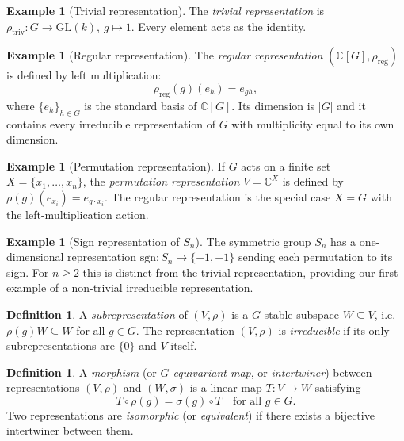 \documentclass[12pt,a4paper]{amsart}
\theoremstyle{definition}
\newtheorem{definition}[theorem]{Definition}
\newtheorem{example}[theorem]{Example}
\begin{document}
\begin{example}[Trivial representation]
The \emph{trivial representation} is $\rho_{\mathrm{triv}} \colon G \to
\mathrm{GL}(k)$, $g \mapsto 1$.  Every element acts as the identity.
\end{example}

\begin{example}[Regular representation]
The \emph{regular representation} $(\mathbb{C}[G], \rho_{\mathrm{reg}})$ is
defined by left multiplication:
\[
    \rho_{\mathrm{reg}}(g)(e_h) = e_{gh},
\]
where $\{e_h\}_{h \in G}$ is the standard basis of $\mathbb{C}[G]$.  Its
dimension is $|G|$ and it contains every irreducible representation of $G$ with
multiplicity equal to its own dimension.
\end{example}

\begin{example}[Permutation representation]
If $G$ acts on a finite set $X = \{x_1,\ldots,x_n\}$, the \emph{permutation
representation} $V = \mathbb{C}^X$ is defined by
$\rho(g)(e_{x_i}) = e_{g \cdot x_i}$.  The regular representation is the special
case $X = G$ with the left-multiplication action.
\end{example}

\begin{example}[Sign representation of $S_n$]
The symmetric group $S_n$ has a one-dimensional representation
$\mathrm{sgn} \colon S_n \to \{+1,-1\}$ sending each permutation to its sign.
For $n \geq 2$ this is distinct from the trivial representation, providing our
first example of a non-trivial irreducible representation.
\end{example}

\begin{definition}
A \emph{subrepresentation} of $(V,\rho)$ is a $G$-stable subspace $W \subseteq V$,
i.e.\ $\rho(g)W \subseteq W$ for all $g \in G$.  The representation $(V,\rho)$ is
\emph{irreducible} if its only subrepresentations are $\{0\}$ and $V$ itself.
\end{definition}

\begin{definition}
A \emph{morphism} (or \emph{$G$-equivariant map}, or \emph{intertwiner}) between
representations $(V,\rho)$ and $(W,\sigma)$ is a linear map $T \colon V \to W$
satisfying
\[
    T \circ \rho(g) = \sigma(g) \circ T \quad \text{for all } g \in G.
\]
Two representations are \emph{isomorphic} (or \emph{equivalent}) if there exists
a bijective intertwiner between them.
\end{definition}
\end{document}
